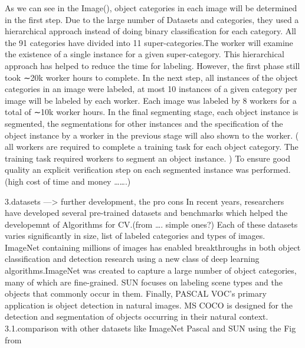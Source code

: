\documentclass[
]{krantz}
\begin{document}
As we can see in the Image(), object categories in each image will be determined in the first step. Due to the large number of Datasets and categories, they used a hierarchical approach instead of doing binary classification for each category. All the 91 categories have divided into 11 super-categories.The worker will examine the existence of a single instance for a given super-category. This hierarchical approach has helped to reduce the time for labeling. However, the first phase still took ∼20k worker hours to complete.
In the next step, all instances of the object categories in an image were labeled, at most 10 instances of a given category per image will be labeled by each worker. Each image was labeled by 8 workers for a total of ∼10k worker hours.
In the final segmenting stage, each object instance is segmented, the segmentations for other instances and the specification of the object instance by a worker in the previous stage will also shown to the worker.
( all workers are required to complete a training task for each object category. The training task required workers to segment an object instance. )
To ensure good quality an explicit verification step on each segmented instance was performed.
(high cost of time and money \ldots\ldots.)

3.datasets ---\textgreater{} further development, the pro cons
In recent years, researchers have developed several pre-trained datasets and benchmarks which helped the developemnt of Algorithms for CV.(from \ldots. simple ones?)
Each of these datasets varies significantly in size, list of labeled categories and types of images.
ImageNet containing millions of images has enabled breakthroughs in both object classification and detection research using a new class of deep learning algorithms.ImageNet was created to capture a large number of object categories, many of which are fine-grained. SUN focuses on labeling scene types and the objects that commonly occur in them. Finally, PASCAL VOC's primary application is object detection in natural images. MS COCO is designed for the detection and segmentation of objects occurring in their natural context. \citep{mccoco}
3.1.comparison with other datasets like ImageNet Pascal and SUN using the Fig from \citep{mccoco}
\end{document}
